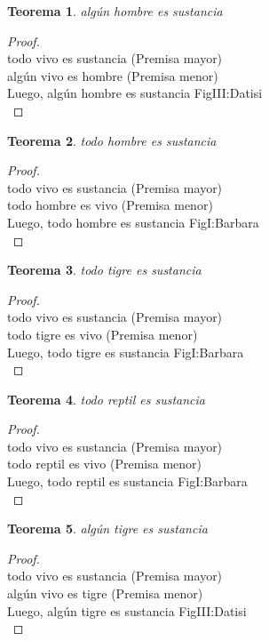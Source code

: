 ﻿\documentclass[12pt]{book}
\newtheorem{theorem}{Teorema}[chapter]
\newtheorem{proof}{Demostración}
\begin{document}
\begin{theorem}
algún hombre es sustancia
\label{th: 59}
\end{theorem}\begin{proof}\\todo vivo es sustancia	 (Premisa mayor) \\algún vivo es hombre	 (Premisa menor) \\Luego, algún hombre es sustancia	FigIII:Datisi \\ \end{proof}
\begin{theorem}
todo hombre es sustancia
\label{th: 60}
\end{theorem}\begin{proof}\\todo vivo es sustancia	 (Premisa mayor) \\todo hombre es vivo	 (Premisa menor) \\Luego, todo hombre es sustancia	FigI:Barbara \\ \end{proof}
\begin{theorem}
todo tigre es sustancia
\label{th: 61}
\end{theorem}\begin{proof}\\todo vivo es sustancia	 (Premisa mayor) \\todo tigre es vivo	 (Premisa menor) \\Luego, todo tigre es sustancia	FigI:Barbara \\ \end{proof}
\begin{theorem}
todo reptil es sustancia
\label{th: 62}
\end{theorem}\begin{proof}\\todo vivo es sustancia	 (Premisa mayor) \\todo reptil es vivo	 (Premisa menor) \\Luego, todo reptil es sustancia	FigI:Barbara \\ \end{proof}
\begin{theorem}
algún tigre es sustancia
\label{th: 63}
\end{theorem}\begin{proof}\\todo vivo es sustancia	 (Premisa mayor) \\algún vivo es tigre	 (Premisa menor) \\Luego, algún tigre es sustancia	FigIII:Datisi \\ \end{proof}
\end{document}
